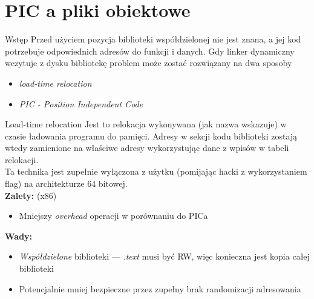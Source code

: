 \section{PIC a pliki obiektowe}
\begin{frame}{Wstęp}
  Przed użyciem pozycja biblioteki współdzielonej nie jest znana, a jej kod
  potrzebuje odpowiednich adresów do funkcji i danych. Gdy linker dynamiczny
  wczytuje z dysku bibliotekę problem może zostać rozwiązany na dwa sposoby
  \begin{itemize}
  \item \textit{load-time relocation}
  \item \textit{PIC - Position Independent Code}
  \end{itemize}
\end{frame}
\begin{frame}{Load-time relocation}
  Jest to relokacja wykonywana (jak nazwa wskazuje) w czasie ładowania programu
  do pamięci. Adresy w sekcji kodu biblioteki zostają wtedy zamienione na
  właściwe adresy wykorzystując dane z wpisów w tabeli relokacji.\\
  \vspace{\baselineskip}
	Ta technika jest zupełnie wyłączona z użytku (pomijając
  hacki z wykorzystaniem flag) na architekturze 64 bitowej.
  \vspace{\baselineskip}\\
  \textbf{Zalety:} (x86)
  \begin{itemize}
  \item Mniejszy \textit{overhead} operacji w porównaniu do PICa
  \end{itemize}
  \textbf{Wady:}
  \begin{itemize}
  \item \textit{Współdzielone} biblioteki --- \textit{.text} musi być RW, więc
    konieczna jest kopia całej biblioteki
  \item Potencjalnie mniej bezpieczne przez zupełny brak randomizacji
    adresowania
  \end{itemize}
\end{frame}
